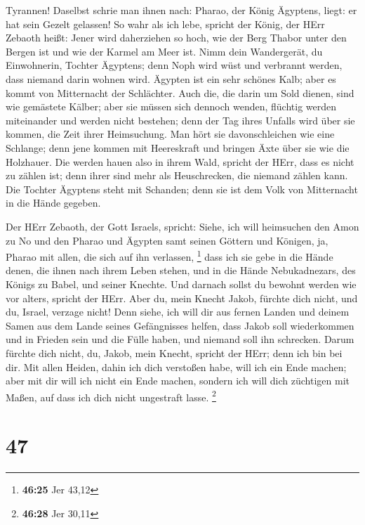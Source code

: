 Tyrannen!  Daselbst schrie man ihnen nach: Pharao, der
König Ägyptens, liegt: er hat sein Gezelt gelassen!  So
wahr als ich lebe, spricht der König, der HErr Zebaoth heißt: Jener wird
daherziehen so hoch, wie der Berg Thabor unter den Bergen ist und wie
der Karmel am Meer ist.  Nimm dein Wandergerät, du
Einwohnerin, Tochter Ägyptens; denn Noph wird wüst und verbrannt werden,
dass niemand darin wohnen wird.  Ägypten ist ein sehr
schönes Kalb; aber es kommt von Mitternacht der Schlächter.
 Auch die, die darin um Sold dienen, sind wie gemästete
Kälber; aber sie müssen sich dennoch wenden, flüchtig werden miteinander
und werden nicht bestehen; denn der Tag ihres Unfalls wird über sie
kommen, die Zeit ihrer Heimsuchung.  Man hört sie
davonschleichen wie eine Schlange; denn jene kommen mit Heereskraft und
bringen Äxte über sie wie die Holzhauer.  Die werden hauen
also in ihrem Wald, spricht der HErr, dass es nicht zu zählen ist; denn
ihrer sind mehr als Heuschrecken, die niemand zählen kann. 
Die Tochter Ägyptens steht mit Schanden; denn sie ist dem Volk von
Mitternacht in die Hände gegeben.

 Der HErr Zebaoth, der Gott Israels, spricht: Siehe, ich
will heimsuchen den Amon zu No und den Pharao und Ägypten samt seinen
Göttern und Königen, ja, Pharao mit allen, die sich auf ihn verlassen,
\footnote{\textbf{46:25} Jer 43,12}  dass ich sie gebe in
die Hände denen, die ihnen nach ihrem Leben stehen, und in die Hände
Nebukadnezars, des Königs zu Babel, und seiner Knechte. Und darnach
sollst du bewohnt werden wie vor alters, spricht der HErr. 
Aber du, mein Knecht Jakob, fürchte dich nicht, und du, Israel, verzage
nicht! Denn siehe, ich will dir aus fernen Landen und deinem Samen aus
dem Lande seines Gefängnisses helfen, dass Jakob soll wiederkommen und
in Frieden sein und die Fülle haben, und niemand soll ihn schrecken.
 Darum fürchte dich nicht, du, Jakob, mein Knecht, spricht
der HErr; denn ich bin bei dir. Mit allen Heiden, dahin ich dich
verstoßen habe, will ich ein Ende machen; aber mit dir will ich nicht
ein Ende machen, sondern ich will dich züchtigen mit Maßen, auf dass ich
dich nicht ungestraft lasse. \footnote{\textbf{46:28} Jer 30,11}

\hypertarget{section-12}{%
\section{47}\label{section-12}}

